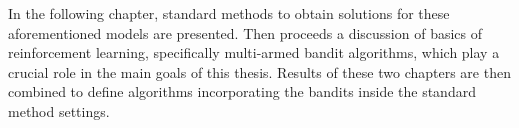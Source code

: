 \documentclass[../main.tex]{subfiles}
\begin{document}
In the following chapter, standard methods to obtain solutions for these aforementioned models are presented.
Then proceeds a discussion of basics of reinforcement learning, specifically multi-armed bandit algorithms, which play a crucial role in the main goals of this thesis.
Results of these two chapters are then combined to define algorithms incorporating the bandits inside the standard method settings.
\end{document}

